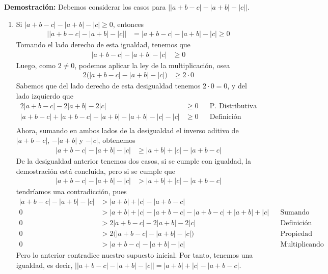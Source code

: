 \documentclass[11pt]{article}
\begin{document}
\begin{enumerate}
\textbf{Demostración:} Debemos considerar los casos para $\big| |a+b-c|-|a+b|-|c| \big|$. \begin{enumerate}[label=Caso (\arabic*)]
 \item Si $|a+b-c|-|a+b|-|c|\geq 0$, entonces \begin{align*}
  \big| |a+b-c|-|a+b|-|c| \big| &= |a+b-c|-|a+b|-|c| \geq 0
 \end{align*} Tomando el lado derecho de esta igualdad, tenemos que \begin{align*}
  |a+b-c|-|a+b|-|c| &\geq 0
 \end{align*} Luego, como $2\neq 0$, podemos aplicar la ley de la multiplicación, osea \begin{align*}
  2 \bigl(|a+b-c|-|a+b|-|c|\bigr) &\geq 2\cdot 0
 \end{align*} Sabemos que del lado derecho de esta desigualdad tenemos $2\cdot 0 =0$, y del lado izquierdo que \begin{align*}
  2|a+b-c|-2|a+b|-2|c| &\geq 0 && \text{P. Distributiva}\\
  |a+b-c|+|a+b-c|-|a+b|-|a+b|-|c|-|c| &\geq 0 && \text{Definición}\\
 \end{align*} Ahora, sumando en ambos lados de la desigualdad el inverso aditivo de $|a+b-c|$, $-|a+b|$ y $-|c|$, obtenemos \begin{align*}
  |a+b-c|-|a+b|-|c|&\geq |a+b|+|c|-|a+b-c|
 \end{align*} De la desigualdad anterior tenemos dos casos, si se cumple con igualdad, la demostración está concluida, pero si se cumple que \begin{align*}
  |a+b-c|-|a+b|-|c|&> |a+b|+|c|-|a+b-c|
 \end{align*} tendríamos una contradicción, pues \begin{align*}
  |a+b-c|-|a+b|-|c|&> |a+b|+|c|-|a+b-c|\\
  0 &> |a+b|+|c|-|a+b-c|-|a+b-c|+|a+b|+|c| && \text{Sumando inversos aditivos}\\
  0 &> 2|a+b-c|-2|a+b|-2|c| && \text{Definición}\\
  0 &> 2 \bigl(|a+b-c|-|a+b|-|c|\bigr)&& \text{Propiedad distributiva}\\
  0 &> |a+b-c|-|a+b|-|c| && \text{Multiplicando por el inv. mult. de 2}
 \end{align*}
 Pero lo anterior contradice nuestro supuesto inicial. Por tanto, tenemos una igualdad, es decir, $\big| |a+b-c|-|a+b|-|c| \big| = |a+b|+|c|-|a+b-c|$.


\end{enumerate}
\end{enumerate}
\end{document}
